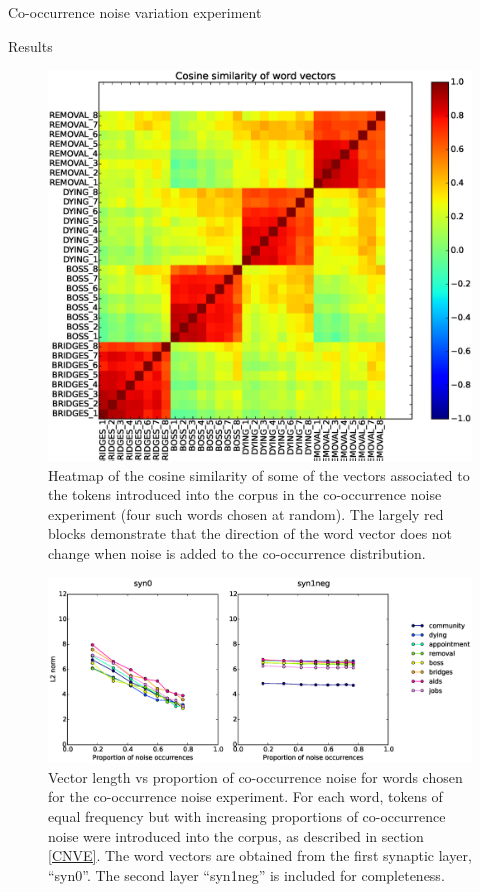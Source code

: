 \documentclass{article} %
\begin{document}
\begin{section}{Co-occurrence noise variation experiment}
\begin{subsection}{Results}
\begin{figure}
	\includegraphics[scale=0.5]{cooccurrence-noise-heatmap}
	\caption{
	Heatmap of the cosine similarity of some of the vectors associated to the
	tokens introduced into the corpus in the co-occurrence noise experiment
	(four such words chosen at random).  The
	largely red blocks demonstrate that the direction of the word vector
	does not change when noise is added to the co-occurrence distribution.
	}
	\label{fig:co-occurrence-noise-heatmap}
\end{figure}

\begin{figure}
	\includegraphics[scale=0.6]{cooccurrence-noise-graph}
	\caption{
	Vector length vs proportion of co-occurrence noise for words
	chosen for the co-occurrence noise experiment.  For each word,
	tokens of equal frequency but with increasing proportions of
	co-occurrence noise were introduced into the corpus, as
	described in section \ref{CNVE}.
	The word vectors are obtained from the first synaptic layer, ``syn0''.
	The second layer ``syn1neg'' is included for completeness.
	}
	\label{fig:co-occurrence-noise-graph}
\end{figure}

\end{subsection}

\end{section}
\end{document}
